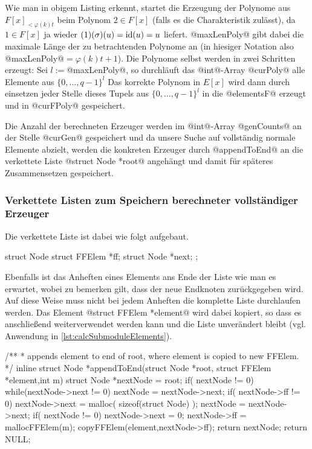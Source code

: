 Wie man in obigem Listing erkennt, startet die Erzeugung der Polynome aus 
$F[x]_{<\varphi(k)t}$ beim Polynom $2 \in F[x]$ (falls es die Charakteristik
zulässt), da $1\in F[x]$ ja wieder $(1)(\sigma)(u) = \operatorname{id}(u) = u$ liefert.
@maxLenPoly@ gibt dabei die maximale Länge der zu betrachtenden Polynome an (in
hiesiger Notation also @maxLenPoly@$= \varphi(k)t+1$). Die Polynome selbst
werden in zwei Schritten erzeugt: Sei $l := $@maxLenPoly@, so
durchläuft das @int@-Array @curPoly@ alle Elemente aus $\{0,\ldots,q-1\}^l$
Das korrekte Polynom in $E[x]$ wird dann durch einsetzen jeder Stelle 
dieses Tupels aus $\{0,\ldots,q-1\}^l$ in die @elementsF@ erzeugt und in 
@curFPoly@ gespeichert.

Die Anzahl der berechneten Erzeuger werden im @int@-Array @genCounts@ an der
Stelle @curGen@ gespeichert und da unsere Suche auf vollständig normale
Elemente abzielt, werden die konkreten Erzeuger durch @appendToEnd@ 
an die verkettete Liste @struct Node *root@ angehängt und 
damit für späteres Zusammensetzen gespeichert.


\subsubsection{Verkettete Listen zum Speichern berechneter vollständiger 
Erzeuger}
\label{subsub:verkettete_listen}

Die verkettete Liste ist dabei wie folgt aufgebaut.

\begin{ccode}[caption={Aus \url{../Sage/enumeratePCNs.c}},
  firstnumber=175, label=lst:structNode]
struct Node {
    struct FFElem *ff;
    struct Node *next;
};
\end{ccode}

Ebenfalls ist das Anheften eines Elements ans Ende der Liste wie man es
erwartet, wobei zu bemerken gilt, dass der neue Endknoten zurückgegeben wird.
Auf diese Weise muss nicht bei jedem Anheften die komplette Liste durchlaufen
werden. Das Element @struct FFElem *element@ wird dabei kopiert, so dass es
anschließend weiterverwendet werden kann und die Liste unverändert bleibt 
(vgl. Anwendung in \autoref{lst:calcSubmoduleElements}).

\begin{ccode}[caption={Aus \url{../Sage/enumeratePCNs.c}},
  firstnumber=180, label=lst:appendToEnd]
/**
 * appends element to end of root, where element is copied to new FFElem.
 */
inline struct Node *appendToEnd(struct Node *root, struct FFElem *element,int m){
    struct Node *nextNode = root;
    if( nextNode != 0){
        while(nextNode->next != 0){
            nextNode = nextNode->next;
        }
        if( nextNode->ff != 0){
            nextNode->next = malloc( sizeof(struct Node) );
            nextNode = nextNode->next;
        }
        if( nextNode != 0){
            nextNode->next = 0;
            nextNode->ff = mallocFFElem(m);
            copyFFElem(element,nextNode->ff);
            return nextNode;
        }
    }
    return NULL;
}
\end{ccode}


